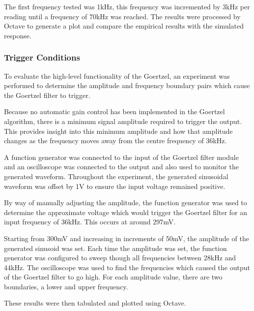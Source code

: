 The first frequency tested was 1kHz, this frequency was incremented by 3kHz per reading until a frequency of 70kHz was reached. The results were processed by Octave to generate a plot and compare the empirical results with the simulated response.


\subsubsection{Trigger Conditions}
To evaluate the high-level functionality of the Goertzel, an experiment was performed to determine the amplitude and frequency boundary pairs which cause the Goertzel filter to trigger.

Because no automatic gain control has been implemented in the Goertzel algorithm, there is a minimum signal amplitude required to trigger the output. This provides insight into this minimum amplitude and how that amplitude changes as the frequency moves away from the centre frequency of 36kHz.

A function generator was connected to the input of the Goertzel filter module and an oscilloscope was connected to the output and also used to monitor the generated waveform. Throughout the experiment, the generated sinusoidal waveform was offset by 1V to ensure the input voltage remained positive.

By way of manually adjusting the amplitude, the function generator was used to determine the approximate voltage which would trigger the Goertzel filter for an input frequency of 36kHz. This occurs at around 297mV.

Starting from 300mV and increasing in increments of 50mV, the amplitude of the generated sinusoid was set. Each time the amplitude was set, the function generator was configured to sweep though all frequencies between 28kHz and 44kHz. The oscilloscope was used to find the frequencies which caused the output of the Goertzel filter to go high. For each amplitude value, there are two boundaries, a lower and upper frequency.

These results were then tabulated and plotted using Octave.












